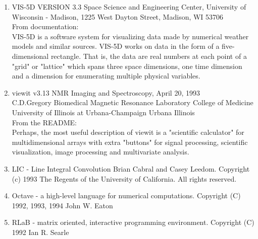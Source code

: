 \begin{enumerate}
\item{VIS-5D VERSION 3.3}\label{soft-VIS-5D}
  \hfil\break
  Space Science and Engineering Center, University of Wisconsin -
  Madison, 1225 West Dayton Street, Madison, WI  53706\\ %
  From documentation:\\ %
  VIS-5D is a software system for visualizing data made by numerical
  weather models and similar sources.  VIS-5D works on data in the
  form of a five-dimensional rectangle.  That is, the data are real
  numbers at each point of a "grid" or "lattice" which spans three
  space dimensions, one time dimension and a dimension for enumerating
  multiple physical variables.

\item{viewit v3.13}\label{soft-viewit}
  \hfil\break
  NMR Imaging and Spectroscopy, April 20, 1993\\ %
  C.D.Gregory Biomedical Magnetic Resonance Laboratory College of
  Medicine University of Illinois at Urbana-Champaign Urbana Illinois\\ %
  From the README:\\ %
  Perhaps, the most useful description of viewit is a "scientific
  calculator" for multidimensional arrays with extra "buttons" for
  signal processing, scientific visualization, image processing and
  multivariate analysis.
  
\item{LIC}\label{soft-LIC}
  - Line Integral Convolution\hfil\break
  Brian Cabral and Casey Leedom. Copyright (c) 1993 The Regents of the
  University of California. All rights reserved.

\item{Octave}\label{soft-Octave}
  - a high-level language for numerical computations.\hfil\break
  Copyright (C) 1992, 1993, 1994 John W. Eaton

\item{RLaB}\label{soft-Rlab}
  - matrix oriented, interactive programming environment.\hfil\break
   Copyright (C) 1992  Ian R. Searle

\end{enumerate}

